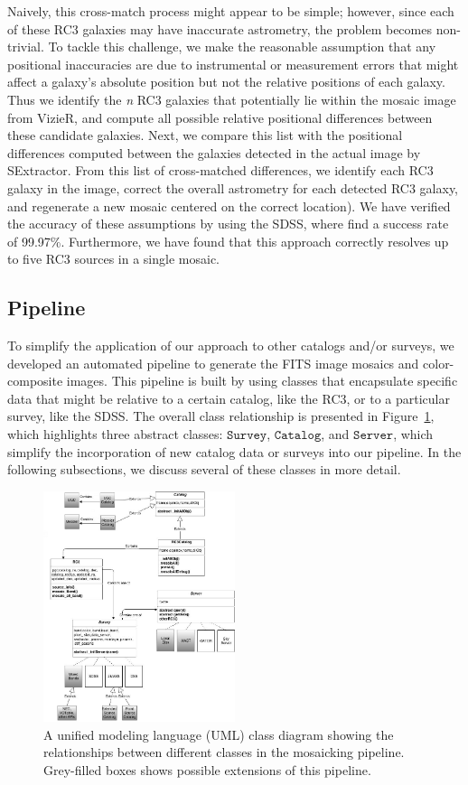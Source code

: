 \documentclass[authoryear, 12pt, 5p, times]{elsarticle}
\begin{document}
Naively, this cross-match process might appear to be simple; however, since each of these RC3 galaxies may have inaccurate astrometry, the problem becomes non-trivial. To tackle this challenge, we make the reasonable assumption that any positional inaccuracies are due to instrumental or measurement errors that might affect a galaxy's absolute position but not the relative positions of each galaxy. Thus we identify the \textit{n} RC3 galaxies that potentially lie within the mosaic image from VizieR, and compute all possible relative positional differences between these candidate galaxies. Next, we compare this list with the positional differences computed between the galaxies detected in the actual image by SExtractor. From this list of cross-matched differences, we identify each RC3 galaxy in the image, correct the overall astrometry for each detected RC3 galaxy, and regenerate a new mosaic centered on the correct location). We have verified the accuracy of these assumptions by using the SDSS, where find a success rate of 99.97\%. Furthermore, we have found that this approach correctly resolves up to five RC3 sources in a single mosaic.
	
\subsection{Pipeline}

To simplify the application of our approach to other catalogs and/or surveys, we developed an automated pipeline to generate the FITS image mosaics and color-composite images. This pipeline is built by using classes that encapsulate specific data that might be relative to a certain catalog, like the RC3, or to a particular survey, like the SDSS. The overall class relationship is presented in Figure~\ref{fig:hierarchy}, which highlights three abstract classes: $\texttt{Survey}$, $\texttt{Catalog}$, and $\texttt{Server}$, which simplify the incorporation of new catalog data or surveys into our pipeline. In the following subsections, we discuss several of these classes in more detail.

\begin{figure}[h]
\includegraphics[width=0.5\textwidth]{figures/hierarchy}
\caption{A unified modeling language (UML) class diagram showing the relationships between different classes in the mosaicking pipeline. Grey-filled boxes shows possible extensions of this pipeline.
\label{fig:hierarchy}
}
\end{figure}
\end{document}
